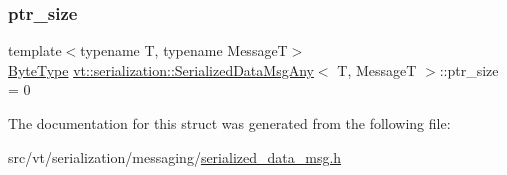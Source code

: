 \subsubsection{\texorpdfstring{ptr\+\_\+size}{ptr\_size}}
{\footnotesize\ttfamily template$<$typename T, typename MessageT$>$ \\
\hyperlink{namespacevt_aab8d55968084610ce3b17057981e9300}{Byte\+Type} \hyperlink{structvt_1_1serialization_1_1_serialized_data_msg_any}{vt\+::serialization\+::\+Serialized\+Data\+Msg\+Any}$<$ T, MessageT $>$\+::ptr\+\_\+size = 0}



The documentation for this struct was generated from the following file\+:\begin{DoxyCompactItemize}
\item 
src/vt/serialization/messaging/\hyperlink{serialized__data__msg_8h}{serialized\+\_\+data\+\_\+msg.\+h}\end{DoxyCompactItemize}
